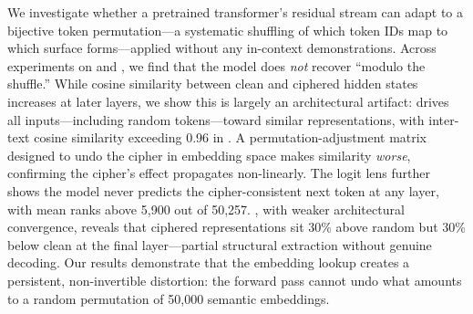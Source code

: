 We investigate whether a pretrained transformer's residual stream can adapt to a bijective token permutation---a systematic shuffling of which token IDs map to which surface forms---applied without any in-context demonstrations. Across experiments on \gpttwo and \pythia, we find that the model does \emph{not} recover ``modulo the shuffle.'' While cosine similarity between clean and ciphered hidden states increases at later layers, we show this is largely an architectural artifact: \layernorm drives all inputs---including random tokens---toward similar representations, with inter-text cosine similarity exceeding 0.96 in \gpttwo. A permutation-adjustment matrix designed to undo the cipher in embedding space makes similarity \emph{worse}, confirming the cipher's effect propagates non-linearly. The logit lens further shows the model never predicts the cipher-consistent next token at any layer, with mean ranks above 5{,}900 out of 50{,}257. \pythia, with weaker architectural convergence, reveals that ciphered representations sit 30\% above random but 30\% below clean at the final layer---partial structural extraction without genuine decoding. Our results demonstrate that the embedding lookup creates a persistent, non-invertible distortion: the forward pass cannot undo what amounts to a random permutation of 50{,}000 semantic embeddings.
